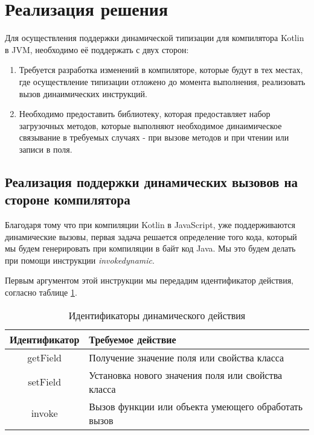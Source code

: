 \section{Реализация решения}

Для осуществления поддержки динамической типизации для компилятора Kotlin в JVM, необходимо её поддержать с двух сторон:

\begin{enumerate}
    \item Требуется разработка изменений в компиляторе, которые будут в тех местах, где осуществление типизации отложено до момента выполнения, реализовать вызов динаимических инструкций.
    \item Необходимо предоставить библиотеку, которая предоставляет набор загрузочных методов, которые выполняют необходимое динаимическое связывание в требуемых случаях - при вызове методов и при чтении или записи в поля.
\end{enumerate}

\subsection{Реализация поддержки динамических вызовов на стороне компилятора}
\label{sec:compileRealization}

Благодаря тому что при компиляции Kotlin в JavaScript, уже поддерживаются динамические вызовы, первая задача решается определение того кода, который мы будем генерировать при компиляции в байт код Java. Мы это будем делать при помощи инструкции \textit{invokedynamic}.


Первым аргументом этой инструкции мы передадим идентификатор действия, согласно таблице \ref{tab:DynamicCallType}. 

\begin{table}[h]
\caption{\label{tab:DynamicCallType}Идентификаторы динамического действия}
\begin{center}
\begin{tabular}{|c|l|}
\hline
Идентификатор	& Требуемое действие \\
\hline
getField & Получение значение поля или свойства класса  \\
setField & Установка нового значения поля или свойства класса	\\
invoke   & Вызов функции или объекта умеющего обработать вызов  \\
\hline
\end{tabular}
\end{center}
\end{table} 

